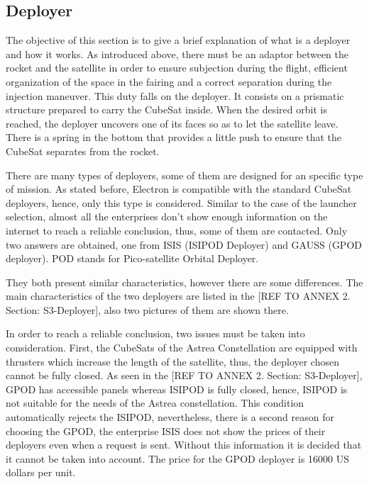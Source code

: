 \subsection{Deployer}
The objective of this section is to give a brief explanation of what is a deployer and how it works. 
As introduced above, there must be an adaptor between the rocket and the satellite in order to ensure subjection during the flight, efficient organization of the space in the fairing and a correct separation during the injection maneuver. This duty falls on the deployer. It consists on a prismatic structure prepared to carry the CubeSat inside. When the desired orbit is reached, the deployer uncovers one of its faces so as to let the satellite leave. There is a spring in the bottom that provides a little push to ensure that the CubeSat separates from the rocket.

There are many types of deployers, some of them are designed for an specific type of mission. As stated before, Electron is compatible with the standard CubeSat deployers, hence, only this type is considered. Similar to the case of the launcher selection, almost all the enterprises don't show enough information on the internet to reach a reliable conclusion, thus, some of them are contacted. Only two answers are obtained, one from ISIS (ISIPOD Deployer) and GAUSS (GPOD deployer). POD stands for Pico-satellite Orbital Deployer. 

They both present similar characteristics, however there are some differences. The main characteristics of the two deployers are listed in the  [{REF TO ANNEX 2. Section: S3-Deployer}], also two pictures of them are shown there.

In order to reach a reliable conclusion, two issues must be taken into consideration. First, the CubeSats of the Astrea Constellation are equipped with thrusters which increase the length of the satellite, thus, the deployer chosen cannot be fully closed. As seen in the [{REF TO ANNEX 2. Section: S3-Deployer}], GPOD has accessible panels whereas ISIPOD is fully closed, hence, ISIPOD is not suitable for the needs of the Astrea constellation. This condition automatically rejects the ISIPOD, nevertheless, there is a second reason for choosing the GPOD, the enterprise ISIS does not show the prices of their deployers even when a request is sent. Without this information it is decided that it cannot be taken into account. The price for the GPOD  deployer is 16000 US dollars per unit. 